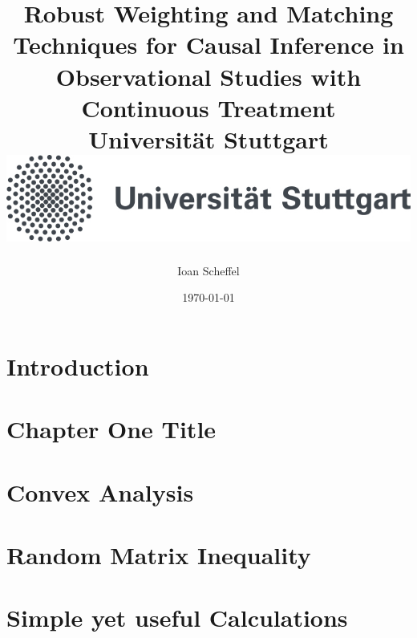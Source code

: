\documentclass[12pt]{report}
\title{
  {
    Robust Weighting and Matching Techniques for Causal Inference in Observational Studies with Continuous Treatment
  }
  \\
  {\large Universität Stuttgart}
  \\
  {\includegraphics{unistuttgart_logo_deutsch.jpg}}
}
\author{Ioan Scheffel}
\date{\today}
\begin{document}
\maketitle

\tableofcontents 

\chapter{Introduction}


\chapter{Chapter One Title}


\chapter{Convex Analysis}


\chapter{Random Matrix Inequality}


\chapter{Simple yet useful Calculations}




{}

\end{document}
